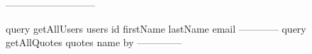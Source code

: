 ---------------------------

query getAllUsers{
  users{
    id
    firstName
    lastName
    email 
  }
}
------------
query getAllQuotes{
  quotes{
    name
    by
  }
}
--------------